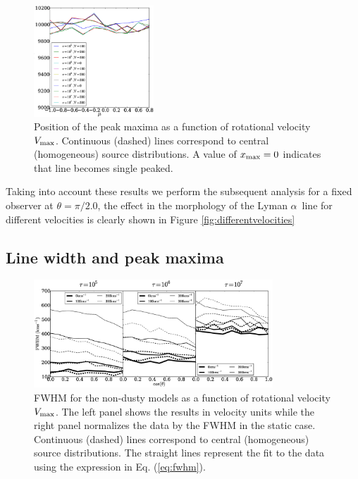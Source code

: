 \documentclass{emulateapj}
\newcommand{\lya}{{Lyman $\alpha$~}}
\begin{document}
\begin{figure}
\begin{center}
  \includegraphics[width=0.4\textwidth]{muhisto.eps}
\end{center}
\caption{Position of the peak maxima as a function of rotational
  velocity $V_{\rm max}$. Continuous (dashed) lines correspond to
  central (homogeneous) source distributions. A value of $x_{\rm
    max}=0$ indicates that line becomes single
  peaked. \label{fig:muhisto}}  
\end{figure}

Taking into account these results we perform the subsequent analysis
for a fixed observer at $\theta = \pi/2.0$, the effect in the morphology
of the \lya	line for different velocities is clearly shown in Figure
 \ref{fig:differentvelocities}
	

\subsection{Line width and peak maxima}
\label{sec:widthpeak}


\begin{figure}
\begin{center}
  \includegraphics[width=0.8\textwidth]{widths.eps}
\end{center}
  \caption{FWHM for the non-dusty models as a function of
    rotational velocity $V_{\rm max}$. The left panel shows the
    results in velocity units while the right panel normalizes
    the data by the FWHM in the static case. 
    Continuous (dashed) lines  correspond to central (homogeneous)
    source distributions. The straight lines represent the fit to
    the data using the expression in Eq. (\ref{eq:fwhm}).
    \label{fig:widthvsmu}} 
\end{figure}
\end{document}
